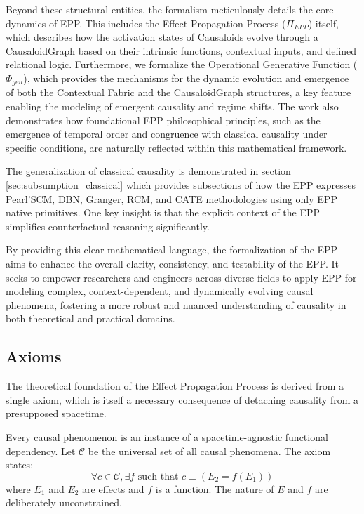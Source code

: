 Beyond these structural entities, the formalism meticulously details the {core dynamics} of EPP. This includes the Effect Propagation Process (\(\Pi_{EPP}\)) itself, which describes how the activation states of {Causaloids} evolve through a {CausaloidGraph} based on their intrinsic functions, contextual inputs, and defined relational logic. Furthermore, we formalize the Operational Generative Function (\(\Phi_{gen}\)), which provides the mechanisms for the dynamic evolution and emergence of both the Contextual Fabric and the CausaloidGraph structures, a key feature enabling the modeling of emergent causality and regime shifts. The work also demonstrates how foundational EPP philosophical principles, such as the emergence of temporal order and congruence with classical causality under specific conditions, are naturally reflected within this mathematical framework.

The generalization of classical causality is demonstrated in section \ref{sec:subsumption_classical} which provides subsections of how the EPP expresses Pearl'SCM, DBN, Granger, RCM, and CATE methodologies using only EPP native primitives. One key insight is that the explicit context of the EPP simplifies counterfactual reasoning significantly. 

By providing this clear mathematical language, the formalization of the EPP aims to enhance the overall clarity, consistency, and testability of the EPP. It seeks to empower researchers and engineers across diverse fields to apply EPP for modeling complex, context-dependent, and dynamically evolving causal phenomena, fostering a more robust and nuanced understanding of causality in both theoretical and practical domains.

\subsection{Axioms}
\label{sec:formalization_axioms}

The theoretical foundation of the Effect Propagation Process is derived from a single axiom, which is itself a necessary consequence of detaching causality from a presupposed spacetime.

\begin{axiom}[of Causality]
Every causal phenomenon is an instance of a spacetime-agnostic functional dependency. Let $\mathcal{C}$ be the universal set of all causal phenomena. The axiom states:
\begin{equation}
\forall c \in \mathcal{C}, \exists f \text{ such that } c \equiv (E_2 = f(E_1))
\end{equation}
where $E_1$ and $E_2$ are effects and $f$ is a function. The nature of $E$ and $f$ are deliberately unconstrained.
\end{axiom}

